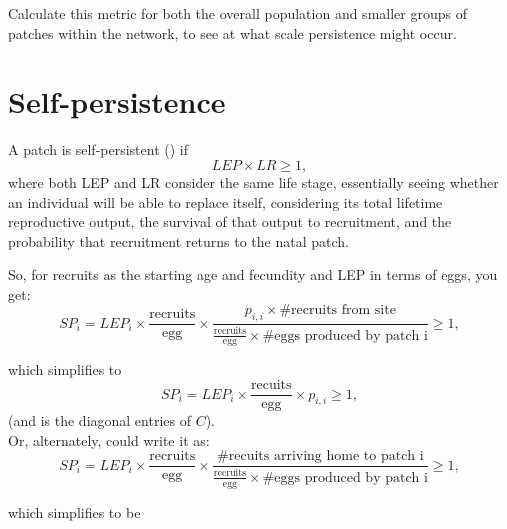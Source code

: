 \documentclass[12pt, oneside]{article}   	%
\begin{document}
Calculate this metric for both the overall population and smaller groups of patches within the network, to see at what scale persistence might occur.


\section{Self-persistence}
A patch is self-persistent (\cite{burgess2014beyond}) if
\begin{equation}
LEP \times LR \geq 1,
\end{equation}
where both LEP and LR consider the same life stage, essentially seeing whether an individual will be able to replace itself, considering its total lifetime reproductive output, the survival of that output to recruitment, and the probability that recruitment returns to the natal patch.

So, for recruits as the starting age and fecundity and LEP in terms of eggs, you get:
\begin{equation}
SP_i = LEP_{i} \times \frac{\text{recruits}}{\text{egg}} \times \frac{p_{i,i} \times \text{\# recruits from site}}{\frac{\text{recruits}}{\text{egg}} \times \# \text{eggs produced by patch i}} \geq 1, 
\end{equation}

which simplifies to
\begin{equation}
SP_i = LEP_{i} \times \frac{\text{recuits}}{\text{egg}} \times p_{i,i} \geq 1 \label{SP_simp_v2}, %
\end{equation}
(and is the diagonal entries of $C$). \\

Or, alternately, could write it as:
\begin{equation}
SP_i = LEP_{i} \times \frac{\text{recruits}}{\text{egg}} \times \frac{\# \text{recuits arriving home to patch i}}{\frac{\text{recruits}}{\text{egg}} \times \# \text{eggs produced by patch i}} \geq 1, 
\end{equation}

which simplifies to be
\end{document}
